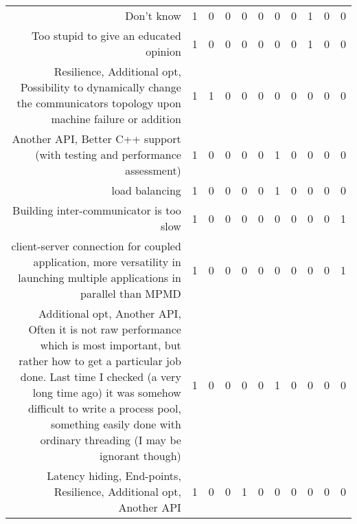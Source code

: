 {\begin{landscape}
\begin{longtable}[htb]{r|c|c|c|c|c|c|c|c|c|c}
{Don't know} & 1 & 0 & 0 & 0 & 0 & 0 & 0 & 1 & 0 & 0 \\%
{Too stupid to give an educated opinion} & 1 & 0 & 0 & 0 & 0 & 0 & 0 & 1 & 0 & 0 \\%
{Resilience, Additional opt, Possibility to dynamically change the communicators topology upon machine failure or addition} & 1 & 1 & 0 & 0 & 0 & 0 & 0 & 0 & 0 & 0 \\%
{Another API, Better C++ support (with testing and performance assessment)} & 1 & 0 & 0 & 0 & 0 & 1 & 0 & 0 & 0 & 0 \\%
{load balancing} & 1 & 0 & 0 & 0 & 0 & 1 & 0 & 0 & 0 & 0 \\%
{Building inter-communicator is too slow} & 1 & 0 & 0 & 0 & 0 & 0 & 0 & 0 & 0 & 1 \\%
{client-server connection for coupled application, more versatility in launching multiple applications in parallel than MPMD} & 1 & 0 & 0 & 0 & 0 & 0 & 0 & 0 & 0 & 1 \\%
{Additional opt, Another API, Often it is not raw performance which is most important, but rather how to get a particular job done.  Last time I checked (a very long time ago) it was somehow difficult to write a process pool, something easily done with ordinary threading (I may be ignorant though)} & 1 & 0 & 0 & 0 & 0 & 1 & 0 & 0 & 0 & 0 \\%
{Latency hiding, End-points, Resilience, Additional opt, Another API} & 1 & 0 & 0 & 1 & 0 & 0 & 0 & 0 & 0 & 0 \\%
\hline%
\end{longtable}%
\end{landscape}}%
\clearpage%
